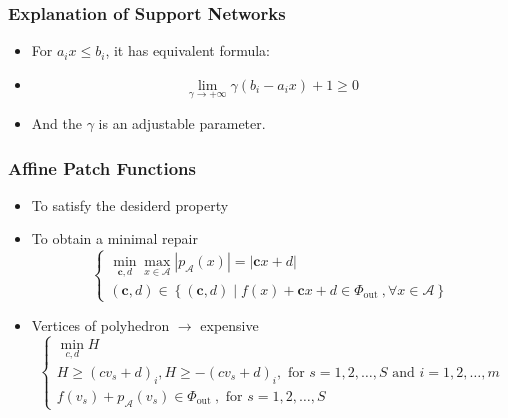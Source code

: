 \documentclass[aspectratio=169 %
,serif,mathserif]{beamer}
\begin{document}
\begin{frame}
	\frametitle{Explanation of Support Networks}
	\begin{itemize}
		\item For $a_i x \leq b_i$, it has equivalent formula:
		\item \begin{equation}
			\lim\limits_{\gamma \to+\infty}  \gamma(b_i -a_ix) + 1 \geq 0 
		\end{equation}
		\item And the $\gamma$ is an adjustable parameter.
	\end{itemize}	
\end{frame}



\begin{frame}
	\frametitle{Affine Patch Functions}
	\begin{itemize}
		\item To satisfy the desiderd property
		\item To obtain a minimal repair \pause
		\begin{equation}
			\left\{\begin{array}{l}
				\min _{\boldsymbol{c}, d} \max _{x \in \mathcal{A}}\left|p_{\mathcal{A}}(x)\right|=|\boldsymbol{c} x+d| \\
				(\boldsymbol{c}, d) \in\left\{(\boldsymbol{c}, d) \mid f(x)+\boldsymbol{c} x+d \in \Phi_{\text {out }}, \forall x \in \mathcal{A}\right\}
				\end{array}\right.
		\end{equation}\pause
		\item Vertices of polyhedron $\to$ expensive
		\begin{equation}
			\left\{\begin{array}{l}
				\min _{c, d} H \\
				H \geq\left(c v_s+d\right)_i, H \geq-\left(c v_s+d\right)_i, \text { for } s=1,2, \ldots, S \text { and } i=1,2, \ldots, m \\
				f\left(v_s\right)+p_{\mathcal{A}}\left(v_s\right) \in \Phi_{\text {out }}, \text { for } s=1,2, \ldots, S
				\end{array}\right.
		\end{equation}
	\end{itemize}
\end{frame}
\end{document}
